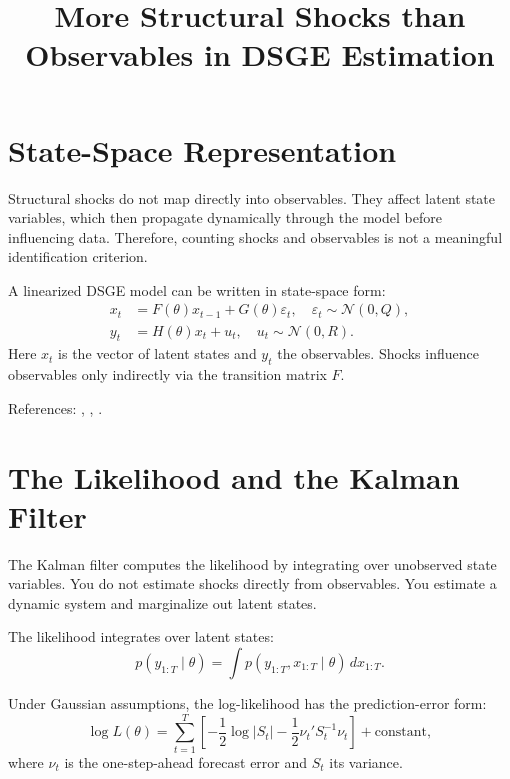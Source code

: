 \documentclass[11pt]{article}
\title{More Structural Shocks than Observables in DSGE Estimation } %
\author{}
\date{}
\begin{document}
\maketitle

\section{State-Space Representation}

\begin{intuitionbox}
Structural shocks do not map directly into observables. 
They affect latent state variables, which then propagate dynamically through the model before influencing data. 
Therefore, counting shocks and observables is not a meaningful identification criterion.
\end{intuitionbox}

\begin{technicalbox}
A linearized DSGE model can be written in state-space form:
\begin{align}
x_t &= F(\theta) x_{t-1} + G(\theta) \varepsilon_t, 
\quad \varepsilon_t \sim \mathcal{N}(0,Q), \\
y_t &= H(\theta) x_t + u_t,
\quad u_t \sim \mathcal{N}(0,R).
\end{align}
Here $x_t$ is the vector of latent states and $y_t$ the observables.
Shocks influence observables only indirectly via the transition matrix $F$.
\end{technicalbox}

References: \citet{an2007}, \citet{herbst2015}, \citet{durbin2012}.

\section{The Likelihood and the Kalman Filter}

\begin{intuitionbox}
The Kalman filter computes the likelihood by integrating over unobserved state variables.
You do not estimate shocks directly from observables.
You estimate a dynamic system and marginalize out latent states.
\end{intuitionbox}

\begin{technicalbox}
The likelihood integrates over latent states:
\begin{equation}
p(y_{1:T}\mid\theta)
=
\int p(y_{1:T},x_{1:T}\mid\theta)\, dx_{1:T}.
\end{equation}

Under Gaussian assumptions, the log-likelihood has the prediction-error form:
\begin{equation}
\log L(\theta)
=
\sum_{t=1}^{T}
\left[
-\frac{1}{2}\log|S_t|
-\frac{1}{2}\nu_t' S_t^{-1}\nu_t
\right]
+ \text{constant},
\end{equation}
where $\nu_t$ is the one-step-ahead forecast error and $S_t$ its variance.
\end{technicalbox}
\end{document}
